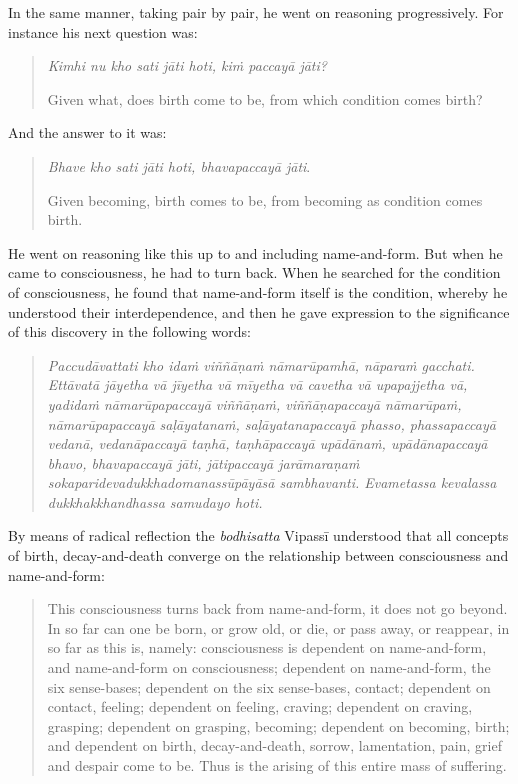In the same manner, taking pair by pair, he went on reasoning progressively. For instance his next question was:

\begin{quote}
\emph{Kimhi nu kho sati jāti hoti, kiṁ paccayā jāti?}

Given what, does birth come to be, from which condition comes birth?
\end{quote}

And the answer to it was:

\begin{quote}
\emph{Bhave kho sati jāti hoti, bhavapaccayā jāti}.

Given becoming, birth comes to be, from becoming as condition comes birth.
\end{quote}

He went on reasoning like this up to and including name-and-form. But when he came to consciousness, he had to turn back. When he searched for the condition of consciousness, he found that name-and-form itself is the condition, whereby he understood their interdependence, and then he gave expression to the significance of this discovery in the following words:

\begin{quote}
\emph{Paccudāvattati kho idaṁ viññāṇaṁ nāmarūpamhā, nāparaṁ gacchati. Ettāvatā jāyetha vā jīyetha vā mīyetha vā cavetha vā upapajjetha vā, yadidaṁ nāmarūpapaccayā viññāṇaṁ, viññāṇapaccayā nāmarūpaṁ, nāmarūpapaccayā saḷāyatanaṁ, saḷāyatanapaccayā phasso, phassapaccayā vedanā, vedanāpaccayā taṇhā, taṇhāpaccayā upādānaṁ, upādānapaccayā bhavo, bhavapaccayā jāti, jātipaccayā jarāmaraṇaṁ sokaparidevadukkhadomanassūpāyāsā sambhavanti. Evametassa kevalassa dukkhakkhandhassa samudayo hoti.}
\end{quote}

By means of radical reflection the \emph{bodhisatta} Vipassī understood that all concepts of birth, decay-and-death converge on the relationship between consciousness and name-and-form:

\begin{quote}
This consciousness turns back from name-and-form, it does not go beyond. In so far can one be born, or grow old, or die, or pass away, or reappear, in so far as this is, namely: consciousness is dependent on name-and-form, and name-and-form on consciousness; dependent on name-and-form, the six sense-bases; dependent on the six sense-bases, contact; dependent on contact, feeling; dependent on feeling, craving; dependent on craving, grasping; dependent on grasping, becoming; dependent on becoming, birth; and dependent on birth, decay-and-death, sorrow, lamentation, pain, grief and despair come to be. Thus is the arising of this entire mass of suffering.
\end{quote}

